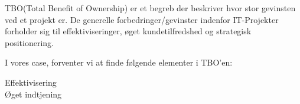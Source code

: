 TBO(Total Benefit of Ownership) er et begreb der beskriver hvor stor gevinsten
ved et projekt er. De generelle forbedringer/gevinster indenfor IT-Projekter
forholder sig til effektiviseringer, øget kundetilfredshed og strategisk
positionering.

I vores case, forventer vi at finde følgende elementer i TBO'en:

\begin{description}
\item[Effektivisering]
\item[Øget indtjening]
\end{description}
